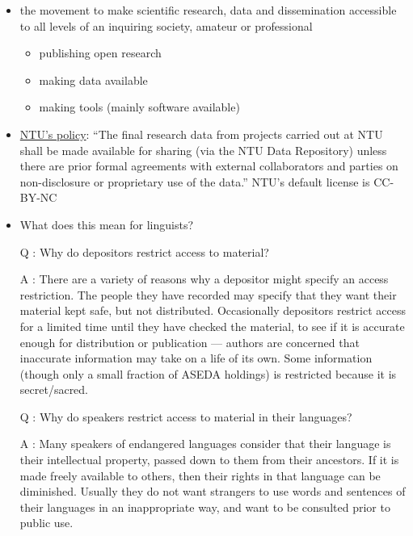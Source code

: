 \documentclass[a4paper,landscape,headrule,footrule,xetex]{foils}
\begin{document}
\begin{itemize}
\item the movement to make scientific research, data and dissemination accessible to all levels of an inquiring society, amateur or professional
  \begin{itemize}
  \item publishing open research
  \item making data available
  \item making tools (mainly software available)
  \end{itemize}
\item \href{http://research.ntu.edu.sg/rieo/RI/Pages/Research-Data-Policies.aspx}{NTU's policy}: ``The final research data from projects carried out
  at NTU shall be made available for sharing (via the NTU Data
  Repository) unless there are prior formal agreements with external
  collaborators and parties on non-disclosure or proprietary use of
  the data.''  NTU's default license is CC-BY-NC 
\item What does this mean for linguists?
\end{itemize}

\begin{itemize}
\item [Q]: Why do depositors restrict access to material?
\item [A]: There are a variety of reasons why a depositor might specify an access restriction.  The people they have recorded may specify that they want their material kept safe, but not distributed.  Occasionally depositors restrict access for a limited time until they have checked the material, to see if it is accurate enough for distribution or publication — authors are concerned that inaccurate information may take on a life of its own.  Some information (though only a small fraction of ASEDA holdings) is restricted because it is secret/sacred.
\newpage
\item [Q]: Why do speakers restrict access to material in their languages?
\item [A]: Many speakers of endangered languages consider that their language is their intellectual property, passed down to them from their ancestors.  If it is made freely available to others, then their rights in that language can be diminished.  Usually they do not want strangers to use words and sentences of their languages in an inappropriate way, and want to be consulted prior to public use. 
\end{itemize}
\end{document}
